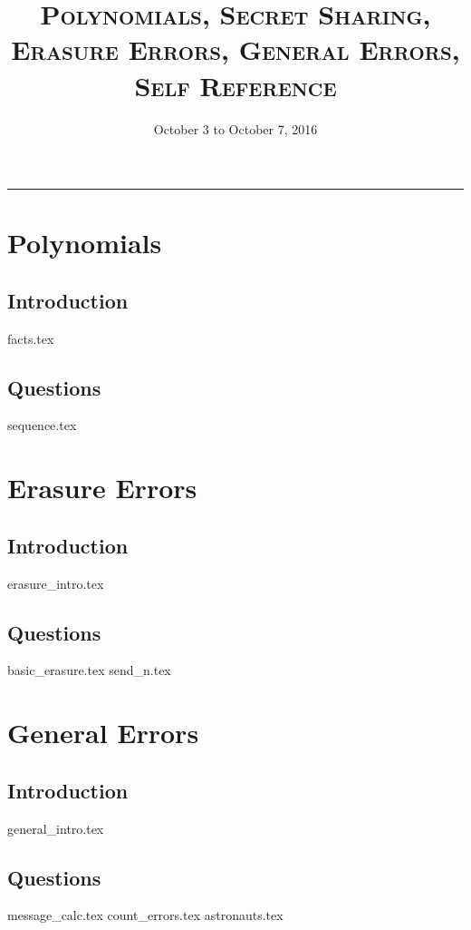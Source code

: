 \documentclass{exam}
\title{\textsc{Polynomials, Secret Sharing, Erasure Errors, General 
Errors, Self Reference }}
\date{October 3 to October 7, 2016}
\begin{document}
\maketitle
\rule{\textwidth}{0.15em}
\fontsize{12}{15}\selectfont
\thispagestyle{empty}

\section{Polynomials}
\subsection{Introduction}
{facts.tex}
\subsection{Questions}
\begin{questions}
{sequence.tex}
\end{questions}

\section{Erasure Errors}
\subsection{Introduction}
{erasure_intro.tex}
\subsection{Questions}
\begin{questions}
{basic_erasure.tex}
{send_n.tex}
\end{questions}

\section{General Errors}
\subsection{Introduction}
{general_intro.tex}
\subsection{Questions}
\begin{questions}
{message_calc.tex}
{count_errors.tex}
{astronauts.tex}
\end{questions}
\end{document}
